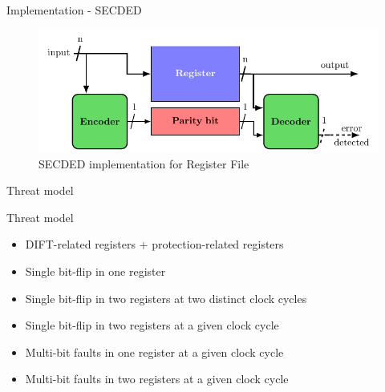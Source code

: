 \begin{frame}{Implementation - SECDED}
    \begin{figure}
        \centering
        \includegraphics[width=.9\textwidth, page=5]{src/3_strategies/img/archi_contremesures.pdf}
        \caption{SECDED implementation for Register File}
        \label{fig:secded_implem_rf}
    \end{figure}
\end{frame}
\begin{frame}{Threat model}
    \begin{block}{Threat model}
        \begin{itemize}
            \item DIFT-related registers + protection-related registers
            \item Single bit-flip in one register
            \item Single bit-flip in two registers at two distinct clock cycles
            \item Single bit-flip in two registers at a given clock cycle
            \item Multi-bit faults in one register at a given clock cycle
            \item Multi-bit faults in two registers at a given clock cycle
        \end{itemize}
    \end{block}
\end{frame}
